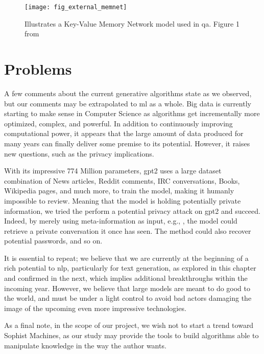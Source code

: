 \begin{figure}
    \centering
    \texttt{[image: fig\_external\_memnet]}
    \caption{Illustrates a Key-Value Memory Network model used in \gls{qa}. Figure 1 from \autocite{paper:journals/corr/MillerFDKBW16}}
    \label{fig:fig_external_memnet}
\end{figure}

\section{Problems}
A few comments about the current generative algorithms state as we observed, but our comments may be extrapolated to \gls{ml} as a whole. Big data is currently starting to make sense in Computer Science as algorithms get incrementally more optimized, complex, and powerful. In addition to continuously improving computational power, it appears that the large amount of data produced for many years can finally deliver some premise to its potential. However, it raises new questions, such as the privacy implications. 

With its impressive 774 Million parameters, \gls{gpt2} uses a large dataset combination of News articles, Reddit comments, IRC conversations, Books, Wikipedia pages, and much more, to train the model, making it humanly impossible to review. Meaning that the model is holding potentially private information, we tried the perform a potential privacy attack on \gls{gpt2} and succeed. Indeed, by merely using meta-information as input, e.g., , the model could retrieve a private conversation it once has seen. The method could also recover potential passwords, and so on.

It is essential to repeat; we believe that we are currently at the beginning of a rich potential to \gls{nlp}, particularly for text generation, as explored in this chapter and confirmed in the next, which implies additional breakthroughs within the incoming year. However, we believe that large models are meant to do good to the world, and must be under a light control to avoid bad actors damaging the image of the upcoming even more impressive technologies.

As a final note, in the scope of our project, we wish not to start a trend toward Sophist Machines, as our study may provide the tools to build algorithms able to manipulate knowledge in the way the author wants.


